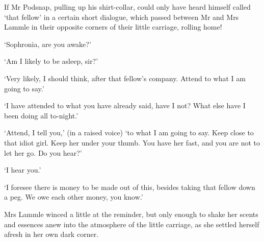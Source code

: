 If Mr Podsnap, pulling up his shirt-collar, could only have heard
himself called ‘that fellow’ in a certain short dialogue, which passed
between Mr and Mrs Lammle in their opposite corners of their little
carriage, rolling home!

‘Sophronia, are you awake?’

‘Am I likely to be asleep, sir?’

‘Very likely, I should think, after that fellow’s company. Attend to
what I am going to say.’

‘I have attended to what you have already said, have I not? What else
have I been doing all to-night.’

‘Attend, I tell you,’ (in a raised voice) ‘to what I am going to say.
Keep close to that idiot girl. Keep her under your thumb. You have her
fast, and you are not to let her go. Do you hear?’

‘I hear you.’

‘I foresee there is money to be made out of this, besides taking that
fellow down a peg. We owe each other money, you know.’

Mrs Lammle winced a little at the reminder, but only enough to shake her
scents and essences anew into the atmosphere of the little carriage, as
she settled herself afresh in her own dark corner.


